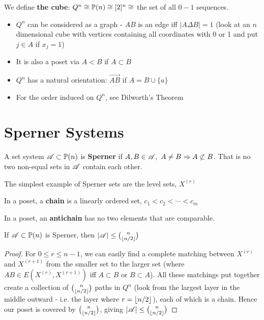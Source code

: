 \documentclass[a4paper]{article}
\begin{document}
{\begin{defi}
	We define \textbf{the cube}: $Q^n\cong\P(n)\cong[2]^n\cong$ the set of all $0-1$ sequences.
\end{defi}
\begin{rem}
	\begin{itemize}
		\item $Q^n$ can be considered as a graph - $AB$ is an edge iff $|A\Delta B|=1$ (look at an $n$ dimensional cube with vertices containing all coordinates with 0 or 1 and put $j\in A$ if $x_j=1$)\\
		\item It is also a poset via $A<B$ if $A\subset B$
		\item $Q^n$ has a natural orientation: $\overrightarrow{AB}$ if $A=B\cup\{a\}$
		\item For the order induced on $Q^n$, see Dilworth's Theorem
	\end{itemize}
\end{rem}

\section{Sperner Systems}
\begin{defi}[Sperner]
	A set system $\A\subset\P(n)$ is \textbf{Sperner} if $A,B\in\A,\ A\neq B\Rightarrow A\not\subset B$. That is no two non-equal sets in $\A$ contain each other.
\end{defi}

The simplest example of Sperner sets are the level sets, $X^{(r)}$

\begin{defi}[Chain]
	In a poset, a \textbf{chain} is a linearly ordered set, $c_1<c_2<\cdots<c_m$
\end{defi}

\begin{defi}[Antichain]
	In a poset, an \textbf{antichain} has no two elements that are comparable.
\end{defi}

\begin{thm}[1, Sperner, 1928]
	If $\A\subset\P(n)$ is Sperner, then $|\A|\leq\binom{n}{\lf n/2\rf}$
\end{thm}
\begin{proof}
	For $0\leq r\leq n-1$, we can easily find a complete matching between $X^{(r)}$ and $X^{(r+1)}$ from the smaller set to the larger set (where $AB\in E\left(X^{(r)},X^{(r+1)}\right)$ iff $A\subset B$ or $B\subset A$). All these matchings put together create a collection of $\binom{n}{\lf n/2\rf}$ paths in $Q^n$ (look from the largest layer in the middle outward - i.e. the layer where $r=\lf n/2\rf$), each of which is a chain. Hence our poset is covered by $\binom{n}{\lf n/2\rf}$, giving $|\A|\leq\binom{n}{\lf n/2\rf}$
\end{proof}}
\end{document}
